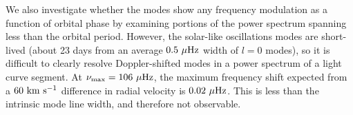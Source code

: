 We also investigate whether the modes show any frequency modulation as a function of orbital phase by examining portions of the power spectrum spanning less than the orbital period. However, the solar-like oscillations modes are short-lived (about 23 days from an average $0.5 \ \mu\rm{Hz}$ width of $l=0$ modes), so it is difficult to clearly resolve Doppler-shifted modes in a power spectrum of a light curve segment. At $\nu_{\rm{max}} = 106 \ \mu \rm{Hz}$, the maximum frequency shift expected from a $60 \ \rm{km} \ \rm{s}^{-1}$ difference in radial velocity is $0.02 \ \mu \rm{Hz}$. This is less than the intrinsic mode line width, and therefore not observable.
